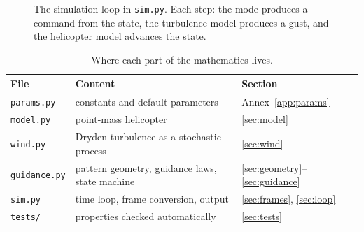 \documentclass[11pt,a4paper]{article}
\newcommand{\code}[1]{\texttt{#1}}
\begin{document}
\begin{figure}[H]
\centering
{}
\caption{The simulation loop in \code{sim.py}. Each step: the mode produces a
command from the state, the turbulence model produces a gust, and the
helicopter model advances the state.}
\label{fig:blocks}
\end{figure}

\begin{table}[H]
\centering
\small
\begin{tabular}{@{}lll@{}}
\toprule
File & Content & Section \\
\midrule
\code{params.py} & constants and default parameters & Annex~\ref{app:params} \\
\code{model.py} & point-mass helicopter & \ref{sec:model} \\
\code{wind.py} & Dryden turbulence as a stochastic process & \ref{sec:wind} \\
\code{guidance.py} & pattern geometry, guidance laws, state machine & \ref{sec:geometry}--\ref{sec:guidance} \\
\code{sim.py} & time loop, frame conversion, output & \ref{sec:frames}, \ref{sec:loop} \\
\code{tests/} & properties checked automatically & \ref{sec:tests} \\
\bottomrule
\end{tabular}
\caption{Where each part of the mathematics lives.}
\end{table}
\end{document}
